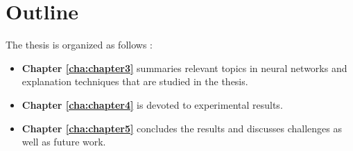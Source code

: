 
\section{Outline}
The thesis is organized as follows :
\begin{itemize}
	\item \textbf{Chapter \ref{cha:chapter3}} summaries relevant topics in  neural networks and explanation techniques that are studied in the thesis.
	\item \textbf{Chapter \ref{cha:chapter4}} is devoted to experimental results.
	\item \textbf{Chapter \ref{cha:chapter5}} concludes the results and discusses challenges as well as future work.
\end{itemize}

